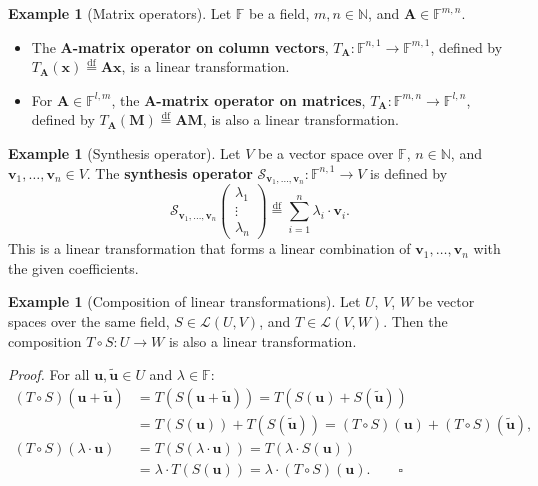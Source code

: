 \documentclass[11pt, a4paper, notitlepage]{report}
\theoremstyle{definition}
\newtheorem{example}[theorem]{Example}
\theoremstyle{remark}
\begin{document}
\begin{example}[Matrix operators]\label{ex:matrix-op}
Let $\mathbb{F}$ be a field, $m,n \in \mathbb{N}$, and $\mathbf{A} \in \mathbb{F}^{m,n}$.
\begin{itemize}
  \item The \textbf{$\mathbf{A}$-matrix operator on column vectors}, $T_{\mathbf{A}} : \mathbb{F}^{n,1} \to \mathbb{F}^{m,1}$,
        defined by $T_{\mathbf{A}}(\mathbf{x}) \stackrel{\mathrm{df}}{=} \mathbf{A}\mathbf{x}$, is a linear transformation.
  \item For $\mathbf{A} \in \mathbb{F}^{l,m}$, the \textbf{$\mathbf{A}$-matrix operator on matrices},
        $T_{\mathbf{A}} : \mathbb{F}^{m,n} \to \mathbb{F}^{l,n}$, defined by
        $T_{\mathbf{A}}(\mathbf{M}) \stackrel{\mathrm{df}}{=} \mathbf{A}\mathbf{M}$, is also a linear transformation.
\end{itemize}
\end{example}

\begin{example}[Synthesis operator]\label{ex:synthesis-op}
Let $V$ be a vector space over $\mathbb{F}$, $n \in \mathbb{N}$, and $\mathbf{v}_1, \ldots, \mathbf{v}_n \in V$.
The \textbf{synthesis operator} $\mathcal{S}_{\mathbf{v}_1,\ldots,\mathbf{v}_n} : \mathbb{F}^{n,1} \to V$
is defined by
\[
  \mathcal{S}_{\mathbf{v}_1,\ldots,\mathbf{v}_n}\!\begin{pmatrix}\lambda_1 \\ \vdots \\ \lambda_n\end{pmatrix}
  \stackrel{\mathrm{df}}{=} \sum_{i=1}^n \lambda_i \cdot \mathbf{v}_i.
\]
This is a linear transformation that forms a linear combination of $\mathbf{v}_1, \ldots, \mathbf{v}_n$
with the given coefficients.
\end{example}

\begin{example}[Composition of linear transformations]\label{ex:composition-lt}
Let $U$, $V$, $W$ be vector spaces over the same field, $S \in \mathcal{L}(U,V)$, and $T \in \mathcal{L}(V,W)$.
Then the composition $T \circ S : U \to W$ is also a linear transformation.

\emph{Proof.} For all $\mathbf{u}, \tilde{\mathbf{u}} \in U$ and $\lambda \in \mathbb{F}$:
\begin{align*}
  (T \circ S)(\mathbf{u} + \tilde{\mathbf{u}})
    &= T(S(\mathbf{u} + \tilde{\mathbf{u}})) = T(S(\mathbf{u}) + S(\tilde{\mathbf{u}})) \\
    &= T(S(\mathbf{u})) + T(S(\tilde{\mathbf{u}}))
     = (T\circ S)(\mathbf{u}) + (T\circ S)(\tilde{\mathbf{u}}),\\
  (T \circ S)(\lambda \cdot \mathbf{u})
    &= T(S(\lambda \cdot \mathbf{u})) = T(\lambda \cdot S(\mathbf{u})) \\
    &= \lambda \cdot T(S(\mathbf{u}))
     = \lambda \cdot (T \circ S)(\mathbf{u}). \qquad \square
\end{align*}
\end{example}
\end{document}
